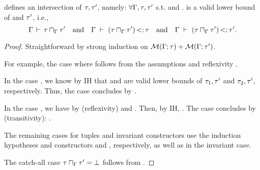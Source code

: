 \begin{theorem}%
\label{thm:meet-sound}
     defines an intersection of $\tau, \tau'$, namely:
    $\forall \Gamma, \tau, \tau'$ s.t. \tyvld{}{\AEnv}
    and .
     is a valid lower bound
    of \ty and $\tau'$, i.e., 
    \[
        \Gamma\,\vdash\,\tau \sqcap_{\Gamma} \tau'
        \quad\text{and}\quad
        \Gamma\;\vdash\;(\tau \sqcap_{\Gamma} \tau') \operatorname{<:} \tau
        \quad\text{and}\quad
        \Gamma\;\vdash\;(\tau \sqcap_{\Gamma} \tau') \operatorname{<:} \tau'.
    \]
\end{theorem}
\begin{proof}
    Straightforward by strong induction on
    $\operatorname{\mathcal{M}}(\Gamma;\tau) + \operatorname{\mathcal{M}}(\Gamma;\tau')$.

    For example, the case where  follows from
    the assumptions and reflexivity \subtydflt{\ty}{\ty}.

    In the case ,
    we know by IH that  and 
    are valid lower bounds of $\tau_1,\tau'$ and $\tau_2,\tau'$, respectively.
    Thus, the case concludes by .

    In the case , we have \subtydflt{\tylb}{\vany}
    by  (reflexivity) and .
    Then, by IH, .
    The case concludes by  (transitivity):
    .
    
    The remaining cases for tuples and invariant constructors
    use the induction hypotheses and constructors  and ,
    respectively, as well as 
    in the invariant case.

    The catch-all case $\tau \sqcap_{\Gamma} \tau' = \bot$
    follows from .
\end{proof}

